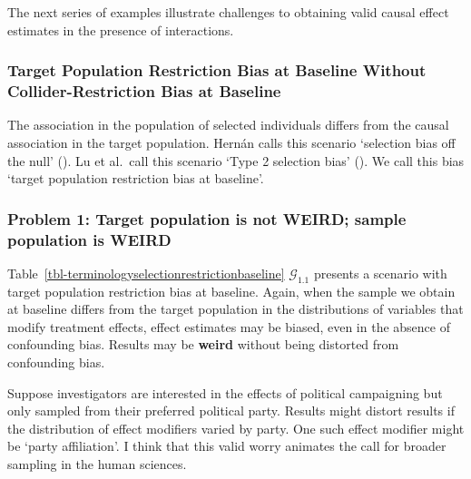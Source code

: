 \documentclass[
  single column]{article}
\begin{document}
The next series of examples illustrate challenges to obtaining valid
causal effect estimates in the presence of interactions.

\subsubsection{Target Population Restriction Bias at Baseline Without
Collider-Restriction Bias at
Baseline}\label{target-population-restriction-bias-at-baseline-without-collider-restriction-bias-at-baseline}

\begin{table}

\caption{\label{tbl-terminologyselectionrestrictionbaseline}The
association in the population of selected individuals differs from the
causal association in the target population. Hernán calls this scenario
`selection bias off the null' (). Lu et al.~call this scenario `Type 2 selection bias'
(). We call this bias
`target population restriction bias at baseline'.}

\centering{

\terminologyselectionrestrictionbaseline

}

\end{table}%

\subsubsection{Problem 1: Target population is not WEIRD; sample
population is
WEIRD}\label{problem-1-target-population-is-not-weird-sample-population-is-weird}

Table~\ref{tbl-terminologyselectionrestrictionbaseline}
\(\mathcal{G}_{1.1}\) presents a scenario with target population
restriction bias at baseline. Again, when the sample we obtain at
baseline differs from the target population in the distributions of
variables that modify treatment effects, effect estimates may be biased,
even in the absence of confounding bias. Results may be \textbf{weird}
without being distorted from confounding bias.

Suppose investigators are interested in the effects of political
campaigning but only sampled from their preferred political party.
Results might distort results if the distribution of effect modifiers
varied by party. One such effect modifier might be `party affiliation'.
I think that this valid worry animates the call for broader sampling in
the human sciences.
\end{document}
